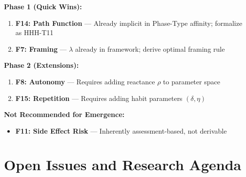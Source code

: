 \begin{tcolorbox}[colback=blue!5!white, colframe=blue!75!black,
    title=\textbf{Recommended Prioritization}]

\textbf{Phase 1 (Quick Wins):}
\begin{enumerate}[nosep]
    \item \textbf{F14: Path Function} --- Already implicit in Phase-Type affinity; formalize as HHH-T11
    \item \textbf{F7: Framing} --- $\lambda$ already in framework; derive optimal framing rule
\end{enumerate}

\textbf{Phase 2 (Extensions):}
\begin{enumerate}[nosep]
    \item \textbf{F8: Autonomy} --- Requires adding reactance $\rho$ to parameter space
    \item \textbf{F15: Repetition} --- Requires adding habit parameters $(\delta, \eta)$
\end{enumerate}

\textbf{Not Recommended for Emergence:}
\begin{itemize}[nosep]
    \item \textbf{F11: Side Effect Risk} --- Inherently assessment-based, not derivable
\end{itemize}

\end{tcolorbox}


\section{Open Issues and Research Agenda}
\label{sec:hhh-open}

